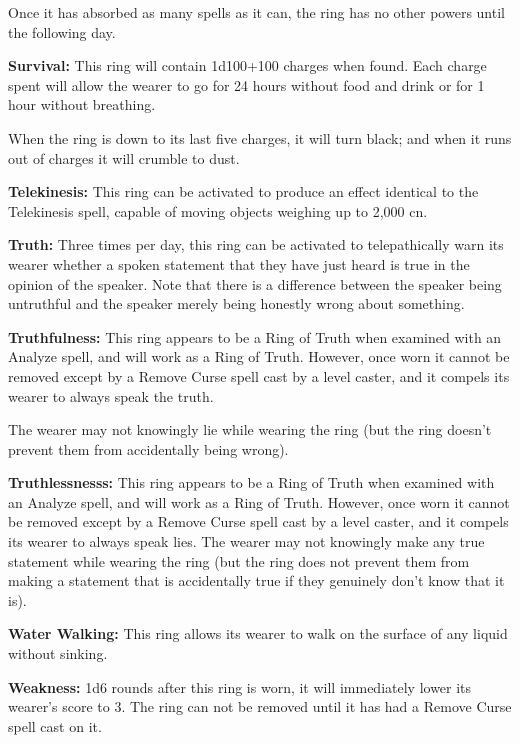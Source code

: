 \begin{multicols*}{2}
Once it has absorbed as many spells as it can, the ring has no other powers until the following day.

\textbf{Survival:} This ring will contain 1d100+100 charges when found. Each charge spent will allow the wearer to go for 24 hours without food and drink or for 1 hour without breathing.

When the ring is down to its last five charges, it will turn black; and when it runs out of charges it will crumble to dust.

\textbf{Telekinesis:} This ring can be activated to produce an effect identical to the Telekinesis spell, capable of moving objects weighing up to 2,000 cn.

\textbf{Truth:} Three times per day, this ring can be activated to telepathically warn its wearer whether a spoken statement that they have just heard is true in the opinion of the speaker. Note that there is a difference between the speaker being untruthful and the speaker merely being honestly wrong about something.

\textbf{Truthfulness:} This ring appears to be a Ring of Truth when examined with an Analyze spell, and will work as a Ring of Truth. However, once worn it cannot be removed except by a Remove Curse spell cast by a  level caster, and it compels its wearer to always speak the truth.

The wearer may not knowingly lie while wearing the ring (but the ring doesn’t prevent them from accidentally being wrong).

\textbf{Truthlessnesss:} This ring appears to be a Ring of Truth when examined with an Analyze spell, and will work as a Ring of Truth. However, once worn it cannot be removed except by a Remove Curse spell cast by a  level caster, and it compels its wearer to always speak lies. The wearer may not knowingly make any true statement while wearing the ring (but the ring does not prevent them from making a statement that is accidentally true if they genuinely don’t know that it is).

\textbf{Water Walking:} This ring allows its wearer to walk on the surface of any liquid without sinking.

\textbf{Weakness:} 1d6 rounds after this ring is worn, it will immediately lower its wearer’s  score to 3. The ring can not be removed until it has had a Remove Curse spell cast on it.


\end{multicols*}

